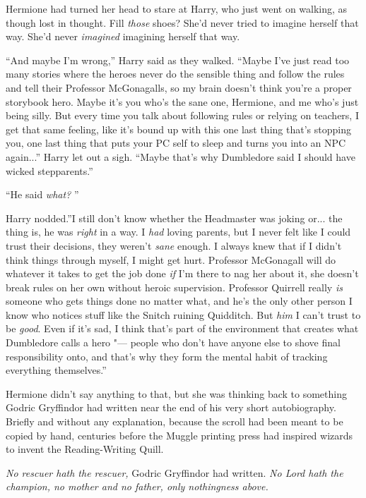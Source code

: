 Hermione had turned her head to stare at Harry, who just went on
walking, as though lost in thought. Fill \emph{those} shoes? She'd never
tried to imagine herself that way. She'd never \emph{imagined} imagining
herself that way.

``And maybe I'm wrong,'' Harry said as they walked. ``Maybe I've just
read too many stories where the heroes never do the sensible thing and
follow the rules and tell their Professor McGonagalls, so my brain
doesn't think you're a proper storybook hero. Maybe it's you who's the
sane one, Hermione, and me who's just being silly. But every time you
talk about following rules or relying on teachers, I get that same
feeling, like it's bound up with this one last thing that's stopping
you, one last thing that puts your PC self to sleep and turns you into
an NPC again...'' Harry let out a sigh. ``Maybe that's why
Dumbledore said I should have wicked stepparents.''

``He said \emph{what?} ''

Harry nodded.''I still don't know whether the Headmaster was joking
or... the thing is, he was \emph{right} in a way. I \emph{had}
loving parents, but I never felt like I could trust their decisions,
they weren't \emph{sane} enough. I always knew that if I didn't think
things through myself, I might get hurt. Professor McGonagall will do
whatever it takes to get the job done \emph{if} I'm there to nag her
about it, she doesn't break rules on her own without heroic supervision.
Professor Quirrell really \emph{is} someone who gets things done no
matter what, and he's the only other person I know who notices stuff
like the Snitch ruining Quidditch. But \emph{him} I can't trust to be
\emph{good}. Even if it's sad, I think that's part of the environment
that creates what Dumbledore calls a hero "--- people who don't have anyone
else to shove final responsibility onto, and that's why they form the
mental habit of tracking everything themselves.''

Hermione didn't say anything to that, but she was thinking back to
something Godric Gryffindor had written near the end of his very short
autobiography. Briefly and without any explanation, because the scroll
had been meant to be copied by hand, centuries before the Muggle
printing press had inspired wizards to invent the Reading-Writing Quill.

\emph{No rescuer hath the rescuer,} Godric Gryffindor had written.
\emph{No Lord hath the champion, no mother and no father, only
nothingness above.}

